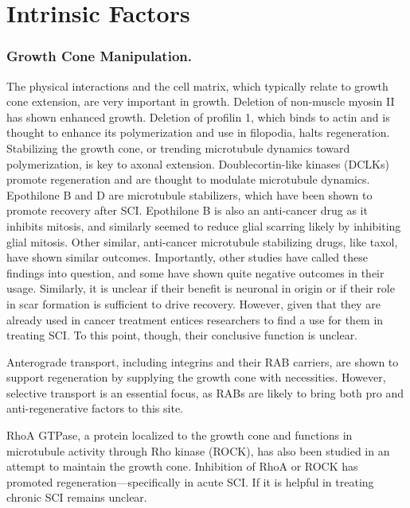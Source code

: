 \section{Intrinsic Factors}

\subsubsection{Growth Cone Manipulation.}

The physical interactions and the cell matrix, which typically relate to growth cone extension, are very important in growth. Deletion of non-muscle myosin II has shown enhanced growth. Deletion of profilin 1, which binds to actin and is thought to enhance its polymerization and use in filopodia, halts regeneration. Stabilizing the growth cone, or trending microtubule dynamics toward polymerization, is key to axonal extension. Doublecortin-like kinases (DCLKs) promote regeneration and are thought to modulate microtubule dynamics. Epothilone B and D are microtubule stabilizers, which have been shown to promote recovery after SCI. Epothilone B is also an anti-cancer drug as it inhibits mitosis, and similarly seemed to reduce glial scarring likely by inhibiting glial mitosis. Other similar, anti-cancer microtubule stabilizing drugs, like taxol, have shown similar outcomes. Importantly, other studies have called these findings into question, and some have shown quite negative outcomes in their usage. Similarly, it is unclear if their benefit is neuronal in origin or if their role in scar formation is sufficient to drive recovery. However, given that they are already used in cancer treatment entices researchers to find a use for them in treating SCI. To this point, though, their conclusive function is unclear.\newline

Anterograde transport, including integrins and their RAB carriers, are shown to support regeneration by supplying the growth cone with necessities. However, selective transport is an essential focus, as RABs are likely to bring both pro and anti-regenerative factors to this site.\newline

RhoA GTPase, a protein localized to the growth cone and functions in microtubule activity through Rho kinase (ROCK), has also been studied in an attempt to maintain the growth cone. Inhibition of RhoA or ROCK has promoted regeneration---specifically in acute SCI. If it is helpful in treating chronic SCI remains unclear.


